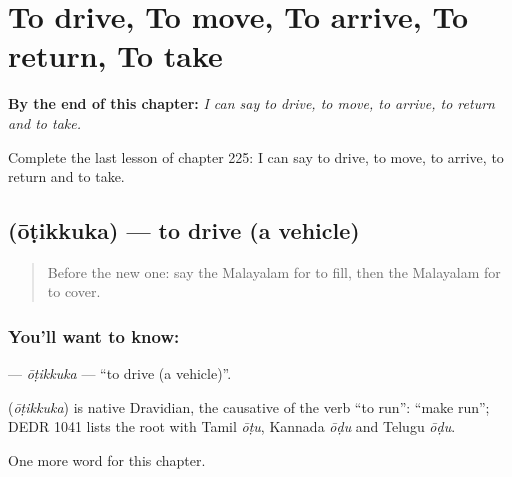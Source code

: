 
\chapter{To drive, To move, To arrive, To return, To take}
\label{ch:ml-to-drive-to-move-to-arrive-to-return-to-take}

\begin{chapteropening}
\textbf{By the end of this chapter:} \emph{I can say to drive, to move, to arrive, to return and to take.}

Complete the last lesson of chapter 225: I can say to drive, to move, to arrive, to return and to take.
\end{chapteropening}

\section[\texorpdfstring{\ml{ഓടിക്കുക} (ōṭikkuka)}{ഓടിക്കുക (ōṭikkuka)}]{ (ōṭikkuka) — to drive (a vehicle)}

\label{lesson:ML-C225-otikkuka}



\begin{quote}
Before the new one: say the Malayalam for to fill, then the Malayalam for to cover.
\end{quote}

\subsection*{You'll want to know: }
\textbf{} — \emph{ōṭikkuka} — \textquotedblleft{}to drive (a vehicle)\textquotedblright{}.

\begin{cousinweb}
\textbf{} (\emph{ōṭikkuka}) is native Dravidian, the causative of the verb \textquotedblleft{}to run\textquotedblright{}: \textquotedblleft{}make run\textquotedblright{}; DEDR 1041 lists the root with Tamil \emph{ōṭu}, Kannada \emph{ōḍu} and Telugu \emph{ōḍu}.
\end{cousinweb}

\begin{grammarlens}[title={What you've built}]
One more word for this chapter.
\end{grammarlens}

